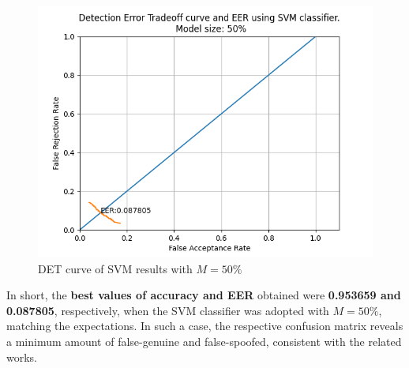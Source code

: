 	\begin{figure}[H]
		\centering
		\includegraphics[scale=.8]{images/results/det/DET_SVM_50}
		\caption{DET curve of SVM results with $M=50\%$}
		\label{fig:detsvm50}
	\end{figure}

	\par In short, the \textbf{best values of accuracy and EER} obtained were \textbf{0.953659 and 0.087805}, respectively, when the SVM classifier was adopted with $M=50\%$, matching the expectations. In such a case, the respective confusion matrix reveals a minimum amount of false-genuine and false-spoofed, consistent with the related works.
	
